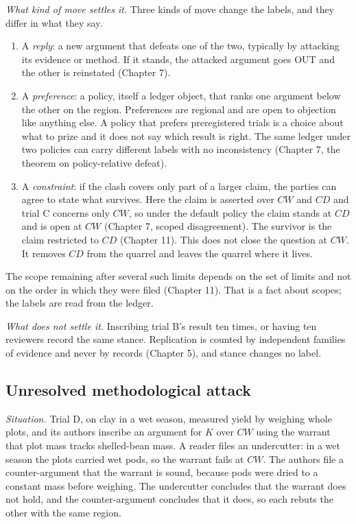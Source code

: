 \documentclass[11pt]{article}
\newcommand{\OUT}{\textsf{OUT}}
\begin{document}
\emph{What kind of move settles it.} Three kinds of move change the labels, and they differ in what they say.
\begin{enumerate}[nosep]
\item A \emph{reply}: a new argument that defeats one of the two, typically by attacking its evidence or method. If it stands, the attacked argument goes \OUT{} and the other is reinstated (Chapter 7).
\item A \emph{preference}: a policy, itself a ledger object, that ranks one argument below the other on the region. Preferences are regional and are open to objection like anything else. A policy that prefers preregistered trials is a choice about what to prize and it does not say which result is right. The same ledger under two policies can carry different labels with no inconsistency (Chapter 7, the theorem on policy-relative defeat).
\item A \emph{constraint}: if the clash covers only part of a larger claim, the parties can agree to state what survives. Here the claim is asserted over $CW$ and $CD$ and trial C concerns only $CW$, so under the default policy the claim stands at $CD$ and is open at $CW$ (Chapter 7, scoped disagreement). The survivor is the claim restricted to $CD$ (Chapter 11). This does not close the question at $CW$. It removes $CD$ from the quarrel and leaves the quarrel where it lives.
\end{enumerate}
The scope remaining after several such limits depends on the set of limits and not on the order in which they were filed (Chapter 11). That is a fact about scopes; the labels are read from the ledger.

\emph{What does not settle it.} Inscribing trial B's result ten times, or having ten reviewers record the same stance. Replication is counted by independent families of evidence and never by records (Chapter 5), and stance changes no label.

\subsection{Unresolved methodological attack}

\emph{Situation.} Trial D, on clay in a wet season, measured yield by weighing whole plots, and its authors inscribe an argument for $K$ over $CW$ using the warrant that plot mass tracks shelled-bean mass. A reader files an undercutter: in a wet season the plots carried wet pods, so the warrant fails at $CW$. The authors file a counter-argument that the warrant is sound, because pods were dried to a constant mass before weighing. The undercutter concludes that the warrant does not hold, and the counter-argument concludes that it does, so each rebuts the other with the same region.
\end{document}
